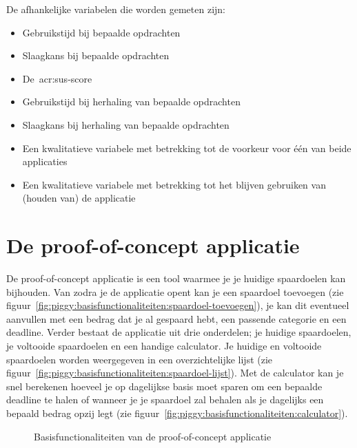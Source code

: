 De afhankelijke variabelen die worden gemeten zijn:
\begin{itemize}
    \item Gebruikstijd bij bepaalde opdrachten
    \item Slaagkans bij bepaalde opdrachten
    \item De~\acrshort{acr:sus}-score
    \item Gebruikstijd bij herhaling van bepaalde opdrachten
    \item Slaagkans bij herhaling van bepaalde opdrachten
    \item Een kwalitatieve variabele met betrekking tot de voorkeur voor één van beide applicaties
    \item Een kwalitatieve variabele met betrekking tot het blijven gebruiken van (houden van) de applicatie
\end{itemize}

\section{De proof-of-concept applicatie}
\label{sec:applicatie}

De proof-of-concept applicatie is een tool waarmee je je huidige spaardoelen kan bijhouden. Van zodra je de applicatie opent kan je een spaardoel toevoegen (zie figuur~\ref{fig:piggy:basisfunctionaliteiten:spaardoel-toevoegen}), je kan dit eventueel aanvullen met een bedrag dat je al gespaard hebt, een passende categorie en een deadline. Verder bestaat de applicatie uit drie onderdelen; je huidige spaardoelen, je voltooide spaardoelen en een handige calculator. Je huidige en voltooide spaardoelen worden weergegeven in een overzichtelijke lijst (zie figuur~\ref{fig:piggy:basisfunctionaliteiten:spaardoel-lijst}). Met de calculator kan je snel berekenen hoeveel je op dagelijkse basis moet sparen om een bepaalde deadline te halen of wanneer je je spaardoel zal behalen als je dagelijks een bepaald bedrag opzij legt (zie figuur~\ref{fig:piggy:basisfunctionaliteiten:calculator}).

\begin{figure}[h!]
    \centering
    \qquad
    \qquad
    \caption{Basisfunctionaliteiten van de proof-of-concept applicatie}
    \label{fig:piggy:basisfunctionaliteiten}
\end{figure}

